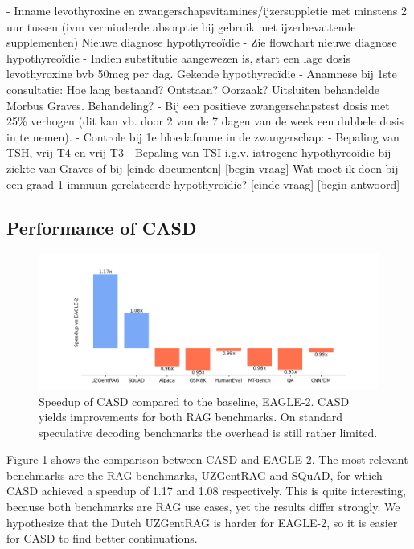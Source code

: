 \begin{wrapverbatim}
- Inname levothyroxine en zwangerschapsvitamines/ijzersuppletie met minstens 2 uur 
tussen (ivm verminderde absorptie bij gebruik met ijzerbevattende supplementen)
Nieuwe diagnose hypothyreoïdie
- Zie flowchart nieuwe diagnose hypothyreoïdie
- Indien substitutie aangewezen is, start een lage dosis levothyroxine bvb 50mcg per 
dag.
Gekende hypothyreoïdie
- Anamnese bij 1ste consultatie: Hoe lang bestaand? Ontstaan? Oorzaak? Uitsluiten 
behandelde Morbus Graves. Behandeling?
- Bij een positieve zwangerschapstest dosis met 25\% verhogen (dit kan vb. door 2 van 
de 7 dagen van de week een dubbele dosis in te nemen).
- Controle bij 1e bloedafname in de zwangerschap:
- Bepaling van TSH, vrij-T4 en vrij-T3
- Bepaling van TSI i.g.v. iatrogene hypothyreoïdie bij ziekte van Graves of bij
[einde documenten]
[begin vraag]
Wat moet ik doen bij een graad 1 immuun-gerelateerde hypothyroïdie?
[einde vraag]
[begin antwoord]

\end{wrapverbatim}


\subsection{Performance of CASD}
\begin{figure}[h]
  \centering
  \captionsetup{justification=centering}
  \includegraphics[width=\linewidth]{fig/speedup_vs_eagle.png}
  \caption{Speedup of CASD compared to the baseline, EAGLE-2. CASD yields improvements for both RAG benchmarks. On standard speculative decoding benchmarks the overhead is still rather limited.}
  \label{fig:speedup_vs_eagle}
\end{figure}

Figure \ref{fig:speedup_vs_eagle} shows the comparison between CASD and EAGLE-2. The most relevant benchmarks are the RAG benchmarks, UZGentRAG and SQuAD, for which CASD achieved a speedup of 1.17 and 1.08 respectively. This is quite interesting, because both benchmarks are RAG use cases, yet the results differ strongly. We hypothesize that the Dutch UZGentRAG is harder for EAGLE-2, so it is easier for CASD to find better continuations.

